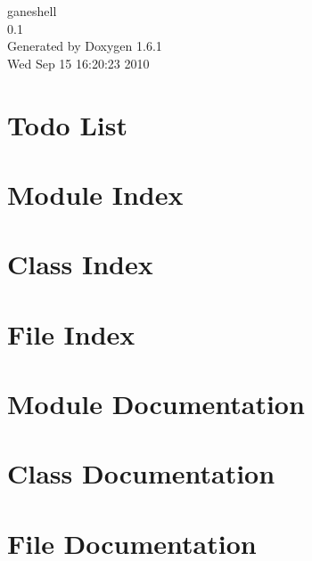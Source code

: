 \documentclass[a4paper]{book}
\begin{document}
\begin{titlepage}
\vspace*{7cm}
\begin{center}
{\Large ganeshell \\[1ex]\large 0.1 }\\
\vspace*{1cm}
{\large Generated by Doxygen 1.6.1}\\
\vspace*{0.5cm}
{\small Wed Sep 15 16:20:23 2010}\\
\end{center}
\end{titlepage}
\clearemptydoublepage
{}
\tableofcontents
\clearemptydoublepage
{}
\chapter{Todo List}
\label{todo}

\chapter{Module Index}

\chapter{Class Index}

\chapter{File Index}

\chapter{Module Documentation}


\chapter{Class Documentation}















\chapter{File Documentation}






















\printindex
\end{document}
